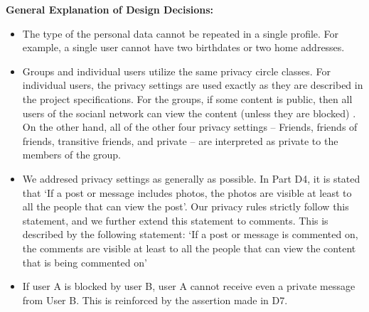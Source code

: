


\myalgsheader

\pagestyle{plain}


\bigskip

{\bf General Explanation of Design Decisions:}
\begin{itemize}
	\item The type of the personal data cannot be repeated in a single profile. For example, a single user cannot have two birthdates or two home addresses.
	\item Groups and individual users utilize the same privacy circle classes. For individual users, the privacy settings are used exactly as they are described in the project specifications. For the groups, if some content is public, then all users of the socianl network can view the content (unless they are blocked) . On the other hand, all of the other four privacy settings -- Friends, friends of friends, transitive friends, and private -- are interpreted as private to the members of the group.
	\item We addresed privacy settings as generally as possible. In Part D4, it is stated that `If a post or message includes photos, the photos are visible at least to all the people that can view the post'. Our privacy rules strictly follow this statement, and we further extend this statement to comments. This is described by the following statement: `If a post or message is commented on, the comments are visible at least to all the people that can view the content that is being commented on'
	\item If user A is blocked by user B, user A cannot receive even a private message from User B. This is reinforced by the assertion made in D7.
\end{itemize}

